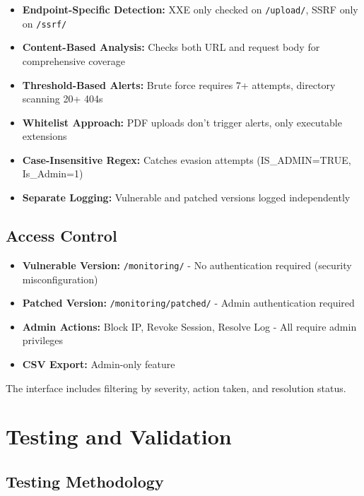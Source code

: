 \documentclass[12pt,a4paper]{article}
\begin{document}
\begin{itemize}[leftmargin=*]
    \item \textbf{Endpoint-Specific Detection:} XXE only checked on \texttt{/upload/}, SSRF only on \texttt{/ssrf/}
    \item \textbf{Content-Based Analysis:} Checks both URL and request body for comprehensive coverage
    \item \textbf{Threshold-Based Alerts:} Brute force requires 7+ attempts, directory scanning 20+ 404s
    \item \textbf{Whitelist Approach:} PDF uploads don't trigger alerts, only executable extensions
    \item \textbf{Case-Insensitive Regex:} Catches evasion attempts (IS\_ADMIN=TRUE, Is\_Admin=1)
    \item \textbf{Separate Logging:} Vulnerable and patched versions logged independently
\end{itemize}

\subsection{Access Control}

\begin{itemize}[leftmargin=*]
    \item \textbf{Vulnerable Version:} \texttt{/monitoring/} - No authentication required (security misconfiguration)
    \item \textbf{Patched Version:} \texttt{/monitoring/patched/} - Admin authentication required
    \item \textbf{Admin Actions:} Block IP, Revoke Session, Resolve Log - All require admin privileges
    \item \textbf{CSV Export:} Admin-only feature
\end{itemize}



The interface includes filtering by severity, action taken, and resolution status.

\newpage

\section{Testing and Validation}

\subsection{Testing Methodology}
\end{document}
